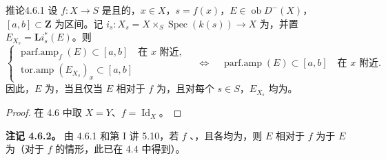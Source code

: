 \begin{SGAresult}{推论}{4.6.1}
设 $f:X\to S$ 是且的，$x\in X$，$s=f(x)$，$E\in\operatorname{ob}D^-(X)$，$[a,b]\subset\mathbf Z$ 为区间。记 $i_s:X_s=X\times_S\operatorname{Spec}(k(s))\to X$ 为，并置 $E_{X_s}=\mathbf Li_s^*(E)$。则
\[
\left\{
\begin{gathered}
\operatorname{parf.amp}_f(E)\subset[a,b]\quad\text{在 }x\text{ 附近},\\
\operatorname{tor.amp}(E_{X_s})_x\subset[a,b]
\end{gathered}
\right.
\quad\Longleftrightarrow\quad
\operatorname{parf.amp}(E)\subset[a,b]\quad\text{在 }x\text{ 附近}.
\]
因此，$E$ 为，当且仅当 $E$ 相对于 $f$ 为，且对每个 $s\in S$，$E_{X_s}$ 均为。
\end{SGAresult}
\begin{proof}在 4.6 中取 $X=Y$、$f=\operatorname{Id}_X$。
\end{proof}
\textbf{注记 4.6.2。} 由 4.6.1 和第 I 讲 5.10，若 $f$ 、，且各均为，则 $E$ 相对于 $f$ 为于 $E$ 为（对于 $f$ 的情形，此已在 4.4 中得到）。

